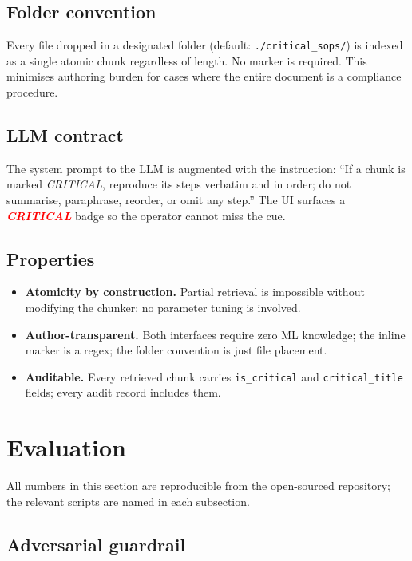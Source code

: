 \documentclass[conference]{IEEEtran}
\begin{document}
\subsection{Folder convention}

Every file dropped in a designated folder (default:
\texttt{./critical\_sops/}) is indexed as a single atomic chunk
regardless of length.  No marker is required.  This minimises
authoring burden for cases where the entire document is a
compliance procedure.

\subsection{LLM contract}

The system prompt to the LLM is augmented with the instruction:
``If a chunk is marked \emph{CRITICAL}, reproduce its steps verbatim
and in order; do not summarise, paraphrase, reorder, or omit any
step.''  The UI surfaces a \emph{\textcolor{red}{\textbf{CRITICAL}}}
badge so the operator cannot miss the cue.

\subsection{Properties}

\begin{itemize}
\item \textbf{Atomicity by construction.}  Partial retrieval is
      impossible without modifying the chunker; no parameter
      tuning is involved.
\item \textbf{Author-transparent.}  Both interfaces require zero
      ML knowledge; the inline marker is a regex; the folder
      convention is just file placement.
\item \textbf{Auditable.}  Every retrieved chunk carries
      \texttt{is\_critical} and \texttt{critical\_title} fields;
      every audit record includes them.
\end{itemize}

\section{Evaluation}
\label{sec:eval}

All numbers in this section are reproducible from the open-sourced
repository; the relevant scripts are named in each subsection.

\subsection{Adversarial guardrail}
\end{document}
